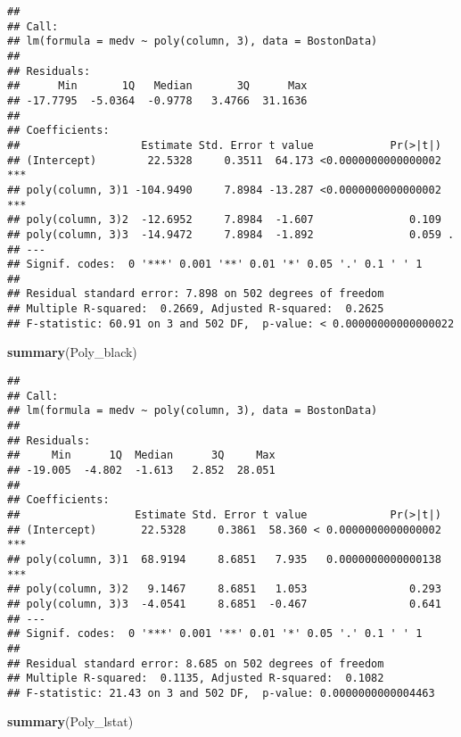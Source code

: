 \documentclass[]{article}
\newenvironment{Shaded}{\begin{snugshade}}{\end{snugshade}}
\newcommand{\KeywordTok}[1]{\textcolor[rgb]{0.13,0.29,0.53}{\textbf{#1}}}
\newcommand{\NormalTok}[1]{#1}
\begin{document}
\begin{verbatim}
## 
## Call:
## lm(formula = medv ~ poly(column, 3), data = BostonData)
## 
## Residuals:
##      Min       1Q   Median       3Q      Max 
## -17.7795  -5.0364  -0.9778   3.4766  31.1636 
## 
## Coefficients:
##                   Estimate Std. Error t value            Pr(>|t|)    
## (Intercept)        22.5328     0.3511  64.173 <0.0000000000000002 ***
## poly(column, 3)1 -104.9490     7.8984 -13.287 <0.0000000000000002 ***
## poly(column, 3)2  -12.6952     7.8984  -1.607               0.109    
## poly(column, 3)3  -14.9472     7.8984  -1.892               0.059 .  
## ---
## Signif. codes:  0 '***' 0.001 '**' 0.01 '*' 0.05 '.' 0.1 ' ' 1
## 
## Residual standard error: 7.898 on 502 degrees of freedom
## Multiple R-squared:  0.2669, Adjusted R-squared:  0.2625 
## F-statistic: 60.91 on 3 and 502 DF,  p-value: < 0.00000000000000022
\end{verbatim}

\begin{Shaded}
\begin{Highlighting}[]
\KeywordTok{summary}\NormalTok{(Poly_black)}
\end{Highlighting}
\end{Shaded}

\begin{verbatim}
## 
## Call:
## lm(formula = medv ~ poly(column, 3), data = BostonData)
## 
## Residuals:
##     Min      1Q  Median      3Q     Max 
## -19.005  -4.802  -1.613   2.852  28.051 
## 
## Coefficients:
##                  Estimate Std. Error t value             Pr(>|t|)    
## (Intercept)       22.5328     0.3861  58.360 < 0.0000000000000002 ***
## poly(column, 3)1  68.9194     8.6851   7.935   0.0000000000000138 ***
## poly(column, 3)2   9.1467     8.6851   1.053                0.293    
## poly(column, 3)3  -4.0541     8.6851  -0.467                0.641    
## ---
## Signif. codes:  0 '***' 0.001 '**' 0.01 '*' 0.05 '.' 0.1 ' ' 1
## 
## Residual standard error: 8.685 on 502 degrees of freedom
## Multiple R-squared:  0.1135, Adjusted R-squared:  0.1082 
## F-statistic: 21.43 on 3 and 502 DF,  p-value: 0.0000000000004463
\end{verbatim}

\begin{Shaded}
\begin{Highlighting}[]
\KeywordTok{summary}\NormalTok{(Poly_lstat)}
\end{Highlighting}
\end{Shaded}
\end{document}
